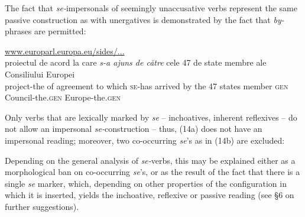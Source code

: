 \documentclass[output=paper]{langsci/langscibook}
\begin{document}
\z


The fact that \textit{se-}impersonals of seemingly unaccusative verbs represent the same passive construction as with unergatives is demonstrated by the fact that \textit{by-}phrases are permitted:

\ea \url{www.europarl.europa.eu/sides/...}\label{ex:giurgea:13}\\
\gll proiectul   de  acord         la care \emph{s-a      ajuns    de către}{ cele 47 de state membre} {ale   Consiliului          Europei} \\
project-the of agreement to which \textsc{se-}has arrived by         the  47      states member {\textsc{gen}}{ Council-the.}{\textsc{gen} }{Europe-the.}{\textsc{gen}}\\
\z

Only verbs that are lexically marked by \textit{se} – inchoatives, inherent reflexives – do not allow an impersonal \textit{se-}construction – thus, (14a) does not have an impersonal reading; moreover, two co-occurring \textit{se}’s as in (14b) are excluded:

\ea\label{ex:giurgea:14}
\z
\z
      
Depending on the general analysis of \textit{se-}verbs, this may be explained either as a morphological ban on co-occurring \textit{se}’s, or as the result of the fact that there is a single \textit{se} marker, which, depending on other properties of the configuration in which it is inserted, yields the inchoative, reflexive or passive reading (see §6 on further suggestions).
\end{document}
